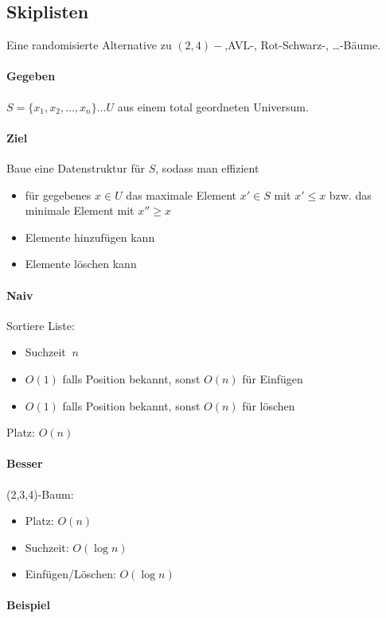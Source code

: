 \subsection{Skiplisten}
Eine randomisierte Alternative zu $(2,4)-$,AVL-, Rot-Schwarz-, \dots -Bäume.

\paragraph*{Gegeben} $S = \{ x_1, x_2, \dots, x_n\} ... U$ aus einem total geordneten Universum. %

\paragraph*{Ziel} Baue eine Datenstruktur für $S$, sodass man effizient
\begin{itemize}
	\item für gegebenes $x \in U$ das maximale Element $x' \in S$ mit $x' \leq x$ bzw. das minimale Element mit $x'' \geq x$
	\item Elemente hinzufügen kann
	\item Elemente löschen kann
\end{itemize}

\paragraph*{Naiv} Sortiere Liste:
\begin{itemize}
	\item Suchzeit $~n$ %
	\item $O(1)$ falls Position bekannt, sonst $O(n)$ für Einfügen
	\item $O(1)$ falls Position bekannt, sonst $O(n)$ für löschen
\end{itemize}
Platz: $O(n)$

\paragraph*{Besser} (2,3,4)-Baum:
\begin{itemize}
	\item Platz: $O(n)$
	\item Suchzeit: $O(\log n)$
	\item Einfügen/Löschen: $O(\log n)$
\end{itemize}

\paragraph*{Beispiel} %

